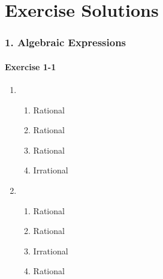 \chapter{Exercise Solutions}
\small{
\subsection*{1. Algebraic Expressions}
\begin{multicols}{3}
\subsubsection*{Exercise 1-1} %

\begin{enumerate}[noitemsep, label=\textbf{\arabic*}. ] 
  
\item %
  \begin{enumerate}[noitemsep, label=\textbf{(\alph*)} ] 
    \item Rational
    \item Rational
    \item Rational
    \item Irrational
    \end{enumerate}
\item %
    \begin{enumerate}[noitemsep, label=\textbf{(\alph*)} ] 
    \item Rational
    \item Rational
    \item Irrational
    \item Rational
    \end{enumerate}


\end{enumerate}
\end{multicols}}
